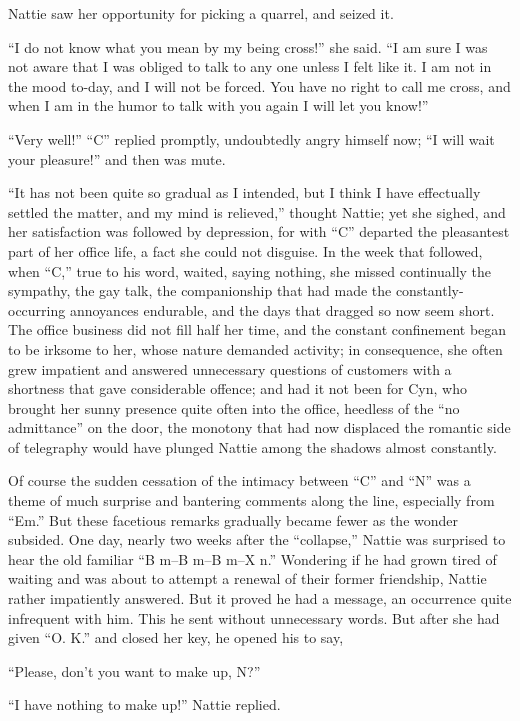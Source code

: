 Nattie saw her opportunity for picking a quarrel, and seized it.

``I do not know what you mean by my being cross!'' she said. ``I am sure I
was not aware that I was obliged to talk to any one unless I felt like
it. I am not in the mood to-day, and I will not be forced. You have no
right to call me cross, and when I am in the humor to talk with you
again I will let you know!''

``Very well!'' ``C'' replied promptly, undoubtedly angry himself now; ``I
will wait your pleasure!'' and then was mute.

``It has not been quite so gradual as I intended, but I think I have
effectually settled the matter, and my mind is relieved,'' thought
Nattie; yet she sighed, and her satisfaction was followed by depression,
for with ``C'' departed the pleasantest part of her office life, a fact
she could not disguise. In the week that followed, when ``C,'' true to his
word, waited, saying nothing, she missed continually the sympathy, the gay
talk, the companionship that had made the constantly-occurring
annoyances endurable, and the days that dragged so now seem short. The
office business did not fill half her time, and the constant confinement
began to be irksome to her, whose nature demanded activity; in
consequence, she often grew impatient and answered unnecessary questions
of customers with a shortness that gave considerable offence; and had it
not been for Cyn, who brought her sunny presence quite often into the
office, heedless of the ``no admittance'' on the door, the monotony that
had now displaced the romantic side of telegraphy would have plunged
Nattie among the shadows almost constantly.

Of course the sudden cessation of the intimacy between ``C'' and ``N'' was a
theme of much surprise and bantering comments along the line, especially
from ``Em.'' But these facetious remarks gradually became fewer as the
wonder subsided. One day, nearly two weeks after the ``collapse,'' Nattie
was surprised to hear the old familiar ``B m--B m--B m--X n.'' Wondering if
he had grown tired of waiting and was about to attempt a renewal of
their former friendship, Nattie rather impatiently answered. But it
proved he had a message, an occurrence quite infrequent with him. This
he sent without unnecessary words. But after she had given ``O. K.'' and
closed her key, he opened his to say,

``Please, don't you want to make up, N?''

``I have nothing to make up!'' Nattie replied.

